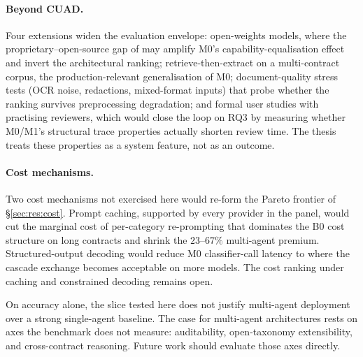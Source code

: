 \paragraph{Beyond CUAD.}
Four extensions widen the evaluation envelope: open-weights models, where
the proprietary--open-source gap of \textcite{liu2025contracteval} may
amplify M0's capability-equalisation effect and invert the architectural
ranking; retrieve-then-extract on a multi-contract corpus, the
production-relevant generalisation of M0; document-quality stress tests
(OCR noise, redactions, mixed-format inputs) that probe whether the
ranking survives preprocessing degradation; and formal user studies with
practising reviewers, which would close the loop on RQ3 by measuring
whether M0/M1's structural trace properties actually shorten review time.
The thesis treats these properties as a system feature, not as an outcome.

\paragraph{Cost mechanisms.}
Two cost mechanisms not exercised here would re-form the Pareto frontier
of \S\ref{sec:res:cost}. Prompt caching, supported by every provider in the
panel, would cut the marginal cost of per-category re-prompting that
dominates the B0 cost structure on long contracts and shrink the
$23$--$67\%$ multi-agent premium. Structured-output decoding would reduce
M0 classifier-call latency to where the cascade exchange becomes acceptable
on more models. The cost ranking under caching and constrained decoding
remains open.

\medskip
\noindent
On accuracy alone, the slice tested here does not justify multi-agent
deployment over a strong single-agent baseline. The case for multi-agent
architectures rests on axes the benchmark does not measure: auditability,
open-taxonomy extensibility, and cross-contract reasoning. Future work
should evaluate those axes directly.
